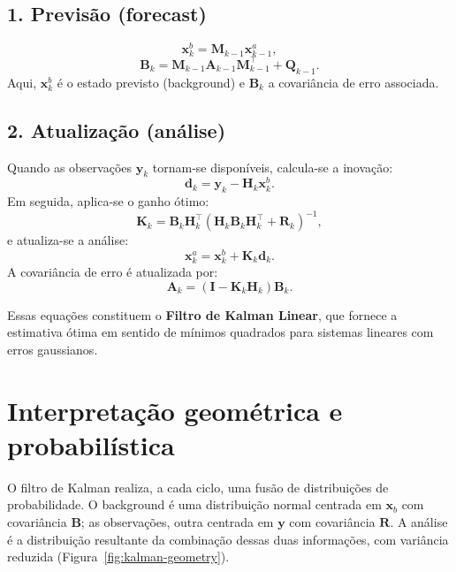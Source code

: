 \subsection*{1. Previsão (forecast)}
\[
\mathbf{x}_k^b = \mathbf{M}_{k-1}\mathbf{x}_{k-1}^a,
\]
\[
\mathbf{B}_k = \mathbf{M}_{k-1}\mathbf{A}_{k-1}\mathbf{M}_{k-1}^\top + \mathbf{Q}_{k-1}.
\]
Aqui, $\mathbf{x}_k^b$ é o estado previsto (background) e $\mathbf{B}_k$ a covariância de erro associada.

\subsection*{2. Atualização (análise)}
Quando as observações $\mathbf{y}_k$ tornam-se disponíveis, calcula-se a inovação:
\[
\mathbf{d}_k = \mathbf{y}_k - \mathbf{H}_k\mathbf{x}_k^b.
\]
Em seguida, aplica-se o ganho ótimo:
\begin{equation}
\mathbf{K}_k = \mathbf{B}_k \mathbf{H}_k^\top
(\mathbf{H}_k \mathbf{B}_k \mathbf{H}_k^\top + \mathbf{R}_k)^{-1},
\label{eq:gain-kalman}
\end{equation}
e atualiza-se a análise:
\[
\mathbf{x}_k^a = \mathbf{x}_k^b + \mathbf{K}_k \mathbf{d}_k.
\]
A covariância de erro é atualizada por:
\[
\mathbf{A}_k = (\mathbf{I} - \mathbf{K}_k \mathbf{H}_k)\mathbf{B}_k.
\]

Essas equações constituem o \textbf{Filtro de Kalman Linear}, que fornece a estimativa ótima em sentido de mínimos quadrados para sistemas lineares com erros gaussianos.

\section{Interpretação geométrica e probabilística}
O filtro de Kalman realiza, a cada ciclo, uma fusão de distribuições de probabilidade.  
O background é uma distribuição normal centrada em $\mathbf{x}_b$ com covariância $\mathbf{B}$; as observações, outra centrada em $\mathbf{y}$ com covariância $\mathbf{R}$.  
A análise é a distribuição resultante da combinação dessas duas informações, com variância reduzida (Figura~\ref{fig:kalman-geometry}).

